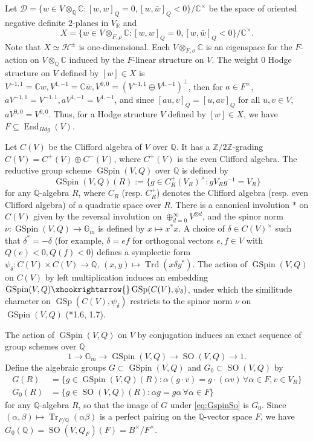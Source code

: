 \documentclass{amsart}
\numberwithin{equation}{subsection}
\numberwithin{theorem}{section}
\theoremstyle{definition}
\theoremstyle{remark}
\newcommand{\bC}{\mathbb{C}}
\newcommand{\bG}{\mathbb{G}}
\newcommand{\bQ}{\mathbb{Q}}
\newcommand{\bR}{\mathbb{R}}
\newcommand{\bZ}{\mathbb{Z}}
\DeclareMathOperator{\GSp}{GSp}
\DeclareMathOperator{\SO}{SO}
\DeclareMathOperator{\GSpin}{GSpin}
\DeclareMathOperator{\Tr}{Tr}
\DeclareMathOperator{\Trd}{Trd}
\DeclareMathOperator{\End}{End}
\begin{document}
Let $\mathcal{D} = \{w\in V\otimes_{\bQ} \bC: [w,w]_Q = 0, [w,\bar{w}]_Q <0 \} / \bC^\times$ be the space of oriented negative definite $2$-planes in $V_{\bR}$ and \begin{equation*} \label{eq:Hermitian_domain}
    X = \{w\in V\otimes_{F, \rho} \bC: [w,w]_Q = 0, [w,\bar{w}]_Q <0 \} / \bC^\times.
\end{equation*} Note that $X\simeq\mathcal{H}^\pm$ is one-dimensional. 
Each $V\otimes_{F, \sigma} \bC$ is an eigenspace for the $F$-action on $V\otimes_\bQ \bC$ induced by the $F$-linear structure on $V$. The weight $0$ Hodge structure on $V$ defined by $[w] \in X$ is $V^{-1,1} = \bC w, V^{1,-1} = \bC \bar{w}, V^{0,0} = (V^{-1,1}\oplus V^{1,-1})^{\perp}$, then for $a\in F^\times$, $aV^{-1,1} = V^{-1,1}, aV^{1,-1} = V^{1,-1}$, and since $[au, v]_Q = [u,av]_Q$ for all $u,v \in V$, $aV^{0,0} = V^{0,0}$. Thus, for a Hodge structure $V$ defined by  $[w] \in X$, we have $F \subseteq \End_{Hdg}(V)$. 

Let $C(V)$ be the Clifford algebra of $V$ over $\bQ$. It has a $\bZ/2\bZ$-grading $C(V) = C^+(V) \oplus C^-(V)$, where $C^+(V)$ is the even Clifford algebra. The reductive group scheme $\GSpin(V,Q)$ over $\bQ$ is defined by  \[\GSpin(V,Q)(R) := \{g\in C^+_R(V_R)^\times: g V_R g^{-1} = V_R\}\] for any $\bQ$-algebra $R$, where $C_R$ (resp. $C_R^+$) denotes the Clifford algebra (resp. even Clifford algebra) of a quadratic space over $R$. There is a canonical involution $*$ on $C(V)$ given by the reversal involution on $\oplus_{d=0}^\infty V^{\otimes d}$, and the spinor norm $\nu: \GSpin(V, Q) \to \bG_m$ is defined by $x\mapsto x^*x$. 
A choice of $\delta \in C(V)^\times$ such that $\delta^* = -\delta$ (for example, $\delta = ef$ for orthogonal vectors $e,f\in V$ with $Q(e)<0, Q(f) < 0$) 
defines a symplectic form $\psi_{\delta}: C(V)\times C(V)\to \bQ, \, (x,y)\mapsto \Trd(x\delta y^*)$. The action of $\GSpin(V, Q)$ on $C(V)$ by left multiplication induces an embedding $\GSpin(V, Q) \xhookrightarrow{} \GSp(C(V), \psi_{\delta})$, under which the similitude character on $\GSp(C(V), \psi_{\delta})$ restricts to the spinor norm $\nu$ on $\GSpin(V, Q)$ (\cite{MR3484114}*{1.6, 1.7}).

The action of $\GSpin(V,Q)$ on $V$ by conjugation induces an exact sequence of group schemes over $\bQ$ \begin{equation} \label{eq:GspinSo}
    1 \to \mathbb{G}_m \to \GSpin(V,Q) \to \SO(V,Q) \to 1.
\end{equation}
Define the algebraic groups $G \subset \GSpin(V, Q)$ and $G_0\subset \SO(V, Q)$ by \begin{align*}
    G(R) &= \{g\in \GSpin(V, Q)(R): \alpha (g\cdot v) = g\cdot (\alpha v) \, \forall \alpha \in F, v\in V_R\} \\
    G_0(R) &= \{g \in \SO(V,Q)(R): \alpha g  = g \alpha \, \forall \alpha \in F\}
\end{align*}
for any $\bQ$-algebra $R$, so that the image of $G$ under \eqref{eq:GspinSo} is $G_0$. Since $(\alpha, \beta)\mapsto \Tr_{F/\bQ}(\alpha\beta)$ is a perfect pairing on the $\bQ$-vector space $F$, we have $G_0(\bQ) = \SO(V, Q_F)(F) = B^\times /F^\times$. 
\end{document}
